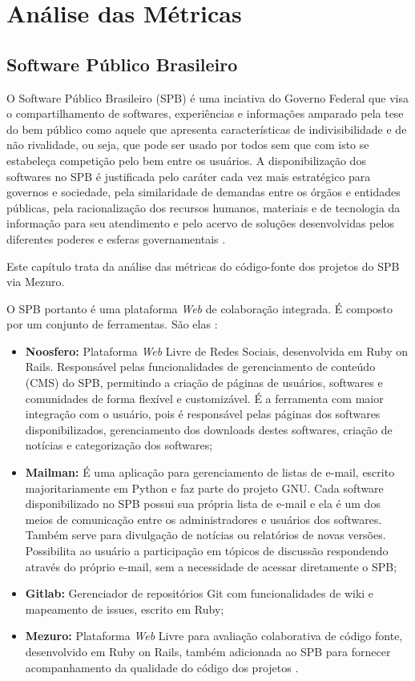 \chapter{Análise das Métricas}

\section{Software Público Brasileiro}

O Software Público Brasileiro (SPB) é uma inciativa do Governo Federal que visa
o compartilhamento de softwares, experiências e informações amparado pela tese
do bem público como aquele que apresenta características de indivisibilidade e
de não rivalidade, ou seja, que pode ser usado por todos sem que com isto se
estabeleça competição pelo bem entre os usuários. A disponibilização dos
softwares no SPB é justificada pelo caráter cada vez mais estratégico para
governos e sociedade, pela similaridade de demandas entre os órgãos e entidades
públicas, pela racionalização dos recursos humanos, materiais e de tecnologia
da informação para seu atendimento e pelo acervo de soluções desenvolvidas
pelos diferentes poderes e esferas governamentais \cite{santos2011in01}.

Este capítulo trata da análise das métricas do código-fonte dos projetos do SPB
via Mezuro.

O SPB portanto é uma plataforma \textit{Web} de colaboração integrada. É composto por um
conjunto de ferramentas. São elas \cite{aboutSPB}:

\begin{itemize}
  \item \textbf{Noosfero:} Plataforma \textit{Web} Livre de Redes Sociais, desenvolvida
	em Ruby on Rails. Responsável pelas funcionalidades de gerenciamento de
	conteúdo (CMS) do SPB, permitindo a criação de páginas de usuários, softwares
	e comunidades de forma flexível e customizável. É a ferramenta com maior
	integração com o usuário, pois é responsável pelas páginas dos softwares
	disponibilizados, gerenciamento dos downloads destes softwares, criação de
	notícias e categorização dos softwares;
  \item \textbf{Mailman:} É uma aplicação para gerenciamento de listas de
	e-mail, escrito majoritariamente em Python e faz parte do projeto GNU. Cada
	software disponibilizado no SPB possui sua própria lista de e-mail e ela é um
	dos meios de comunicação entre os administradores e usuários dos softwares.
	Também serve para divulgação de notícias ou relatórios de novas versões.
	Possibilita ao usuário a participação em tópicos de discussão respondendo
	através do próprio e-mail, sem a necessidade de acessar diretamente o SPB;
	\item \textbf{Gitlab:} Gerenciador de repositórios Git com funcionalidades de
	wiki e mapeamento de issues, escrito em Ruby;
	\item \textbf{Mezuro:} Plataforma \textit{Web} Livre para avaliação colaborativa de
	código fonte, desenvolvido em Ruby on Rails, também adicionada ao SPB para
	fornecer acompanhamento da qualidade do código dos projetos \cite{aboutSPB}.
\end{itemize}

